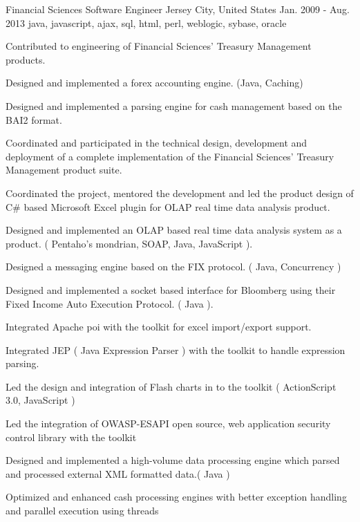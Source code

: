 \cventry
    {Financial Sciences} %
    {Software Engineer} %
    {Jersey City, United States} %
    {Jan. 2009 - Aug. 2013} %
    { java, javascript, ajax, sql, html, perl, weblogic, sybase, oracle } %
    {
        Contributed to engineering of Financial Sciences' Treasury Management products.
    \begin{cvitems} %
        \item { Designed and implemented a forex accounting engine. (Java, Caching)}
        \item { Designed and implemented a parsing engine for cash management based on the BAI2 format.}
        \item { Coordinated and participated in the technical design, development and deployment of a complete implementation of the Financial Sciences' Treasury Management product suite.}
        \item { Coordinated the project, mentored the development and led the product design of C\# based Microsoft Excel plugin for OLAP real time data analysis product.}
        \item { Designed and implemented an OLAP based real time data analysis system as a product. ( Pentaho's mondrian, SOAP, Java, JavaScript ).}
        \item { Designed a messaging engine based on the FIX protocol. ( Java, Concurrency )}
        \item { Designed and implemented a socket based interface for Bloomberg using their Fixed Income Auto Execution Protocol. ( Java ).}
        \item { Integrated Apache poi with the toolkit for excel import/export support.}
        \item { Integrated JEP ( Java Expression Parser ) with the toolkit to handle expression parsing.}
        \item { Led the design and integration of Flash charts in to the toolkit ( ActionScript 3.0, JavaScript )}
        \item { Led the integration of OWASP-ESAPI open source, web application security control library with the toolkit}
        \item { Designed and implemented a high-volume data processing engine which parsed and processed external XML formatted data.( Java )}
        \item { Optimized and enhanced cash processing engines with better exception handling and parallel execution using threads }
    \end{cvitems}
    }